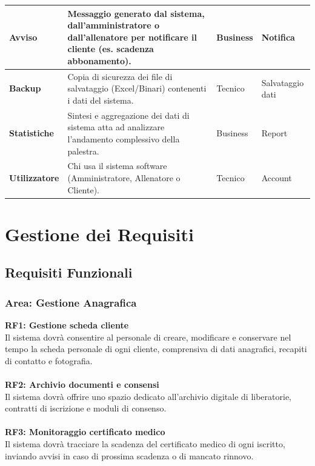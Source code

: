 \documentclass[12pt,a4paper]{report}
\begin{document}
\begin{table}[H]
\begin{tabular}{|p{3.8cm}|p{5.3cm}|p{1.8cm}|p{3.2cm}|}
\hline
\textbf{Avviso} & Messaggio generato dal sistema, dall'amministratore o dall'allenatore per notificare il cliente (es. scadenza abbonamento). & Business & Notifica \\
\hline
\textbf{Backup} & Copia di sicurezza dei file di salvataggio (Excel/Binari) contenenti i dati del sistema. & Tecnico & Salvataggio dati \\
\hline
\textbf{Statistiche} & Sintesi e aggregazione dei dati di sistema atta ad analizzare l'andamento complessivo della palestra. & Business & Report \\
\hline
\textbf{Utilizzatore} & Chi usa il sistema software (Amministratore, Allenatore o Cliente). & Tecnico & Account \\
\hline
\hline
\end{tabular}
\end{table}

\chapter{Gestione dei Requisiti}
\label{ch:requisiti}

\section{Requisiti Funzionali}

\subsection{Area: Gestione Anagrafica}

\noindent\textbf{RF1: Gestione scheda cliente}\\
Il sistema dovrà consentire al personale di creare, modificare e conservare nel tempo la scheda personale di ogni cliente, comprensiva di dati anagrafici, recapiti di contatto e fotografia.\\
\\
\noindent\textbf{RF2: Archivio documenti e consensi}\\
Il sistema dovrà offrire uno spazio dedicato all'archivio digitale di liberatorie, contratti di iscrizione e moduli di consenso.\\
\\
\noindent\textbf{RF3: Monitoraggio certificato medico}\\
Il sistema dovrà tracciare la scadenza del certificato medico di ogni iscritto, inviando avvisi in caso di prossima scadenza o di mancato rinnovo.\\
\\
\end{document}

